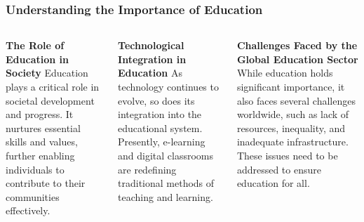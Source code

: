 \documentclass[5pt]{beamer}
\begin{document}
\begin{frame}
\frametitle{Understanding the Importance of Education}
\begin{columns}
\begin{column}{0.3\textwidth}
\begin{block}{\textbf{The Role of Education in Society}}
Education plays a critical role in societal development and progress. It nurtures essential skills and values, further enabling individuals to contribute to their communities effectively.
\end{block}
\end{column}
\begin{column}{0.3\textwidth}
\begin{block}{\textbf{Technological Integration in Education}}
As technology continues to evolve, so does its integration into the educational system. Presently, e-learning and digital classrooms are redefining traditional methods of teaching and learning.
\end{block}
\end{column}
\begin{column}{0.3\textwidth}
\begin{block}{\textbf{Challenges Faced by the Global Education Sector}}
While education holds significant importance, it also faces several challenges worldwide, such as lack of resources, inequality, and inadequate infrastructure. These issues need to be addressed to ensure education for all.
\end{block}
\end{column}
\end{columns}
\end{frame}
\end{document}
